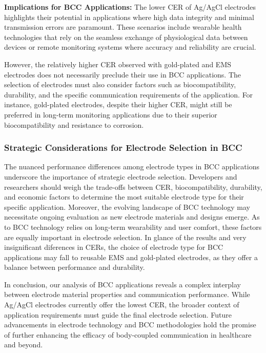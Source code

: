 \documentclass[conference]{IEEEtran}
\begin{document}
\textbf{Implications for BCC Applications:} The lower CER of Ag/AgCl electrodes highlights their potential in applications where high data integrity and minimal transmission errors are paramount. These scenarios include wearable health technologies that rely on the seamless exchange of physiological data between devices or remote monitoring systems where accuracy and reliability are crucial.

However, the relatively higher CER observed with gold-plated and EMS electrodes does not necessarily preclude their use in BCC applications. The selection of electrodes must also consider factors such as biocompatibility, durability, and the specific communication requirements of the application. For instance, gold-plated electrodes, despite their higher CER, might still be preferred in long-term monitoring applications due to their superior biocompatibility and resistance to corrosion. 

\subsubsection{Strategic Considerations for Electrode Selection in BCC}

The nuanced performance differences among electrode types in BCC applications underscore the importance of strategic electrode selection. Developers and researchers should weigh the trade-offs between CER, biocompatibility, durability, and economic factors to determine the most suitable electrode type for their specific application. Moreover, the evolving landscape of BCC technology may necessitate ongoing evaluation as new electrode materials and designs emerge. As to BCC technology relies on long-term wearability and user comfort, these factors are equally important in electrode selection. In glance of the results and very insignificant diferences in CERs, the choice of electrode type for BCC applications may fall to reusable EMS and gold-plated electrodes, as they offer a balance between performance and durability.

In conclusion, our analysis of BCC applications reveals a complex interplay between electrode material properties and communication performance. While Ag/AgCl electrodes currently offer the lowest CER, the broader context of application requirements must guide the final electrode selection. Future advancements in electrode technology and BCC methodologies hold the promise of further enhancing the efficacy of body-coupled communication in healthcare and beyond.
\end{document}
